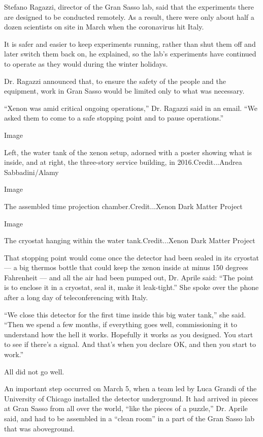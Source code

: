 Stefano Ragazzi, director of the Gran Sasso lab, said that the
experiments there are designed to be conducted remotely. As a result,
there were only about half a dozen scientists on site in March when the
coronavirus hit Italy.

It is safer and easier to keep experiments running, rather than shut
them off and later switch them back on, he explained, so the lab's
experiments have continued to operate as they would during the winter
holidays.

Dr. Ragazzi announced that, to ensure the safety of the people and the
equipment, work in Gran Sasso would be limited only to what was
necessary.

``Xenon was amid critical ongoing operations,'' Dr. Ragazzi said in an
email. ``We asked them to come to a safe stopping point and to pause
operations.''

Image

Left, the water tank of the xenon setup, adorned with a poster showing
what is inside, and at right, the three-story service building, in
2016.Credit...Andrea Sabbadini/Alamy

Image

The assembled time projection chamber.Credit...Xenon Dark Matter Project

Image

The cryostat hanging within the water tank.Credit...Xenon Dark Matter
Project

That stopping point would come once the detector had been sealed in its
cryostat --- a big thermos bottle that could keep the xenon inside at
minus 150 degrees Fahrenheit --- and all the air had been pumped out,
Dr. Aprile said: ``The point is to enclose it in a cryostat, seal it,
make it leak-tight.'' She spoke over the phone after a long day of
teleconferencing with Italy.

``We close this detector for the first time inside this big water
tank,'' she said. ``Then we spend a few months, if everything goes well,
commissioning it to understand how the hell it works. Hopefully it works
as you designed. You start to see if there's a signal. And that's when
you declare OK, and then you start to work.''

All did not go well.

An important step occurred on March 5, when a team led by Luca Grandi of
the University of Chicago installed the detector underground. It had
arrived in pieces at Gran Sasso from all over the world, ``like the
pieces of a puzzle,'' Dr. Aprile said, and had to be assembled in a
``clean room'' in a part of the Gran Sasso lab that was aboveground.

